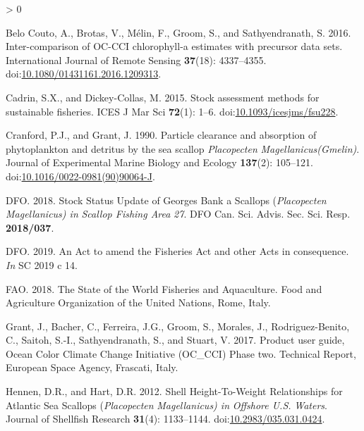 \documentclass[
]{article}
\newlength{\cslhangindent}
\newenvironment{CSLReferences}[2] %
 {%
  \setlength{\parindent}{0pt}
  \ifodd #1 \everypar{\setlength{\hangindent}{\cslhangindent}}\ignorespaces\fi
  \ifnum #2 > 0
  \setlength{\parskip}{#2\baselineskip}
  \fi
 }%
 {}
\begin{document}
\hypertarget{refs}{}
\begin{CSLReferences}{1}{0}
\leavevmode\hypertarget{ref-belocoutoIntercomparisonOCCCIChlorophylla2016}{}%
Belo Couto, A., Brotas, V., Mélin, F., Groom, S., and Sathyendranath, S. 2016. Inter-comparison of {OC-CCI} chlorophyll-a estimates with precursor data sets. International Journal of Remote Sensing \textbf{37}(18): 4337--4355. doi:\href{https://doi.org/10.1080/01431161.2016.1209313}{10.1080/01431161.2016.1209313}.

\leavevmode\hypertarget{ref-cadrinStockAssessmentMethods2015}{}%
Cadrin, S.X., and Dickey-Collas, M. 2015. Stock assessment methods for sustainable fisheries. ICES J Mar Sci \textbf{72}(1): 1--6. doi:\href{https://doi.org/10.1093/icesjms/fsu228}{10.1093/icesjms/fsu228}.

\leavevmode\hypertarget{ref-cranfordParticleClearanceAbsorption1990}{}%
Cranford, P.J., and Grant, J. 1990. Particle clearance and absorption of phytoplankton and detritus by the sea scallop {\emph{Placopecten}}{ \emph{Magellanicus}}{\emph{\emph{(}}}{\emph{\emph{Gmelin}}}{\emph{\emph{)}}}. Journal of Experimental Marine Biology and Ecology \textbf{137}(2): 105--121. doi:\href{https://doi.org/10.1016/0022-0981(90)90064-J}{10.1016/0022-0981(90)90064-J}.

\leavevmode\hypertarget{ref-dfoStockStatusUpdate2018}{}%
DFO. 2018. Stock {Status Update} of {Georges Bank} a {Scallops} ({\emph{Placopecten}}{ \emph{Magellanicus}}{\emph{\emph{) in}} }{\emph{\emph{Scallop Fishing Area}}}{ \emph{\emph{27}}}. DFO Can. Sci. Advis. Sec. Sci. Resp. \textbf{2018/037}.

\leavevmode\hypertarget{ref-dfoActAmendFisheries2019}{}%
DFO. 2019. An {Act} to amend the {Fisheries Act} and other {Acts} in consequence. \emph{In} SC 2019 c 14.

\leavevmode\hypertarget{ref-faoStateWorldFisheries2018}{}%
FAO. 2018. The {State} of the {World Fisheries} and {Aquaculture}. {Food and Agriculture Organization of the United Nations}, {Rome, Italy}.

\leavevmode\hypertarget{ref-grantProductUserGuide2017}{}%
Grant, J., Bacher, C., Ferreira, J.G., Groom, S., Morales, J., Rodriguez-Benito, C., Saitoh, S.-I., Sathyendranath, S., and Stuart, V. 2017. Product user guide, {Ocean Color Climate Change Initiative} ({OC}\_{CCI}) {Phase} two. Technical Report, {European Space Agency}, {Frascati, Italy}.

\leavevmode\hypertarget{ref-hennenShellHeightToWeightRelationships2012}{}%
Hennen, D.R., and Hart, D.R. 2012. Shell {Height-To-Weight Relationships} for {Atlantic Sea Scallops} ({\emph{Placopecten}}{ \emph{Magellanicus}}{\emph{\emph{) in}} }{\emph{\emph{Offshore U}}}{\emph{\emph{.}}}{\emph{\emph{S}}}{\emph{\emph{.}} }{\emph{\emph{Waters}}}. Journal of Shellfish Research \textbf{31}(4): 1133--1144. doi:\href{https://doi.org/10.2983/035.031.0424}{10.2983/035.031.0424}.


\end{CSLReferences}
\end{document}
